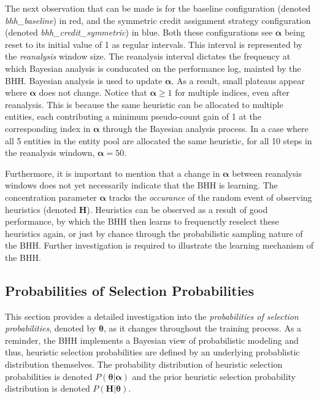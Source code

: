 The next observation that can be made is for the baseline configuration (denoted \textit{bhh\_baseline}) in red, and the symmetric credit assignment strategy configuration (denoted \textit{bhh\_credit\_symmetric}) in blue. Both these configurations see $\boldsymbol{\alpha}$ being reset to its initial value of 1 as regular intervals. This interval is represented by the \textit{reanalysis} window size. The reanalysis interval dictates the frequency at which Bayesian analysis is conducated on the performance log, mainted by the \acs{BHH}. Bayesian analysis is used to update $\boldsymbol{\alpha}$. As a result, small plateaus appear where $\boldsymbol{\alpha}$ does not change. Notice that $\boldsymbol{\alpha} \geq 1$ for multiple indices, even after reanalysis. This is because the same heuristic can be allocated to multiple entities, each contributing a minimum pseudo-count gain of 1 at the corresponding index in $\boldsymbol{\alpha}$ through the Bayesian analysis process. In a case where all 5 entities in the entity pool are allocated the same heuristic, for all 10 steps in the reanalysis windown, $\boldsymbol{\alpha} = 50$.

Furthermore, it is important to mention that a change in $\boldsymbol{\alpha}$ between reanalysis windows does not yet necessarily indicate that the \acs{BHH} is learning. The concentration parameter $\boldsymbol{\alpha}$ tracks the \textit{occurance} of the random event of observing heuristics (denoted $\boldsymbol{{H}}$). Heuristics can be observed as a result of good performance, by which the \acs{BHH} then learns to frequenctly reselect these heuristics again, or just by chance through the probabilistic sampling nature of the \acs{BHH}. Further investigation is required to illustrate the learning mechanism of the \acs{BHH}.




\subsection{Probabilities of Selection Probabilities}\label{sec:results:case_study:probs_of_select_probs}

This section provides a detailed investigation into the \textit{probabilities of selection probabilities}, denoted by $\boldsymbol{\theta}$, as it changes throughout the training process. As a reminder, the \acs{BHH} implements a Bayesian view of probabilistic modeling and thus, heuristic selection probabilities are defined by an underlying probablistic distribution themselves. The probability distribution of heuristic selection probabilities is denoted $P(\boldsymbol{\theta} \vert \boldsymbol{\alpha})$ and the prior heuristic selection probability distribution is denoted $P(\boldsymbol{H} \vert \boldsymbol{\theta})$.

